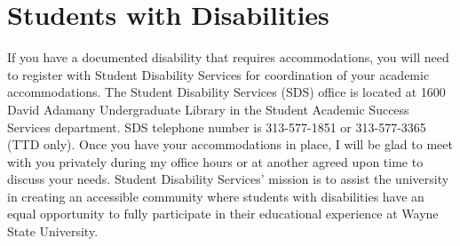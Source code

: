 \section*{Students with Disabilities}
If you have a documented disability that requires accommodations, you will need to register with Student Disability Services for coordination of your academic accommodations. 
The Student Disability Services (SDS) office is located at 1600 David Adamany Undergraduate Library in the Student Academic Success Services department. 
SDS telephone number is 313-577-1851 or 313-577-3365 (TTD only). 
Once you have your accommodations in place, I will be glad to meet with you privately during my office hours or at another agreed upon time to discuss your needs. 
Student Disability Services' mission is to assist the university in creating an accessible community where students with disabilities have an equal opportunity to fully participate in their educational experience at Wayne State University.